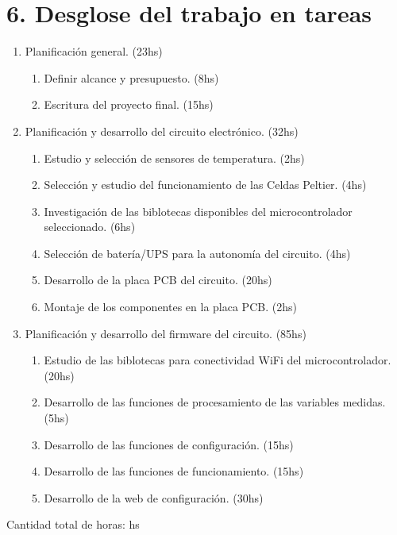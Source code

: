 \section{6. Desglose del trabajo en tareas}
\label{sec:wbs}


\begin{enumerate}
\item Planificación general. (23hs)
	\begin{enumerate}
	\item Definir alcance y presupuesto. (8hs)
  \item Escritura del proyecto final. (15hs) 
	\end{enumerate}
\item Planificación y desarrollo del circuito electrónico. (32hs)
	\begin{enumerate}
	\item Estudio y selección de sensores de temperatura. (2hs)
  \item Selección y estudio del funcionamiento de las Celdas Peltier. (4hs)
  \item Investigación de las biblotecas disponibles del microcontrolador seleccionado. (6hs)
  \item Selección de batería/UPS para la autonomía del circuito. (4hs)
  \item Desarrollo de la placa PCB del circuito. (20hs)
  \item Montaje de los componentes en la placa PCB. (2hs)
	\end{enumerate}
\item Planificación y desarrollo del firmware del circuito. (85hs) %
	\begin{enumerate}
	\item Estudio de las biblotecas para conectividad WiFi del microcontrolador. (20hs)
  \item Desarrollo de las funciones de procesamiento de las variables medidas. (5hs)
  \item Desarrollo de las funciones de configuración. (15hs)
  \item Desarrollo de las funciones de funcionamiento. (15hs)
  \item Desarrollo de la web de configuración. (30hs)
	\end{enumerate}
\end{enumerate}

Cantidad total de horas: hs